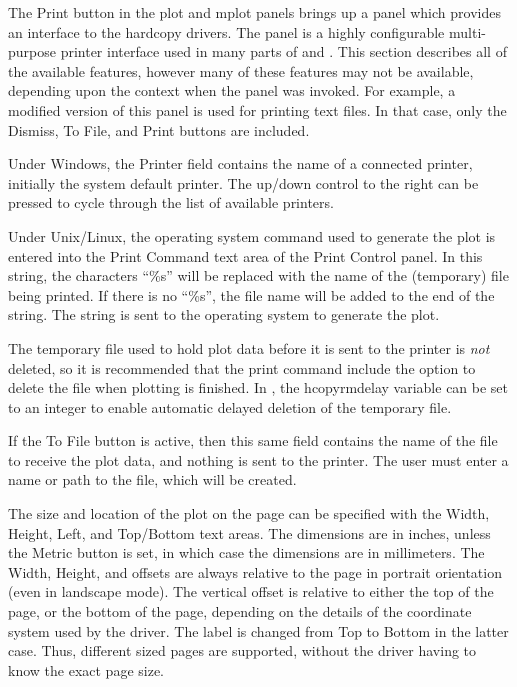 The {\cb Print} button in the plot and mplot panels brings up a panel
which provides an interface to the hardcopy drivers.  The panel is a
highly configurable multi-purpose printer interface used in many parts
of {\Xic} and {\WRspice}.  This section describes all of the available
features, however many of these features may not be available,
depending upon the context when the panel was invoked.  For example, a
modified version of this panel is used for printing text files.  In
that case, only the {\cb Dismiss}, {\cb To File}, and {\cb Print}
buttons are included.

Under Windows, the {\cb Printer} field contains the name of a
connected printer, initially the system default printer.  The up/down
control to the right can be pressed to cycle through the list of
available printers.

Under Unix/Linux, the operating system command used to generate the
plot is entered into the {\cb Print Command} text area of the Print
Control panel.  In this string, the characters ``{\vt \%s}'' will be
replaced with the name of the (temporary) file being printed.  If
there is no ``{\vt \%s}'', the file name will be added to the end of
the string.  The string is sent to the operating system to generate
the plot.

The temporary file used to hold plot data before it is sent to the
printer is {\it not\/} deleted, so it is recommended that the print
command include the option to delete the file when plotting is
finished.  In {\WRspice}, the {\et hcopyrmdelay} variable can be set
to an integer to enable automatic delayed deletion of the temporary
file.

If the {\cb To File} button is active, then this same field contains
the name of the file to receive the plot data, and nothing is sent to
the printer.  The user must enter a name or path to the file, which
will be created.

The size and location of the plot on the page can be specified with
the {\cb Width}, {\cb Height}, {\cb Left}, and {\cb Top}/{\cb Bottom}
text areas.  The dimensions are in inches, unless the {\cb Metric}
button is set, in which case the dimensions are in millimeters.  The
{\cb Width}, {\cb Height}, and offsets are always relative to the page
in portrait orientation (even in landscape mode).  The vertical offset
is relative to either the top of the page, or the bottom of the page,
depending on the details of the coordinate system used by the driver. 
The label is changed from {\cb Top} to {\cb Bottom} in the latter
case.  Thus, different sized pages are supported, without the driver
having to know the exact page size.

